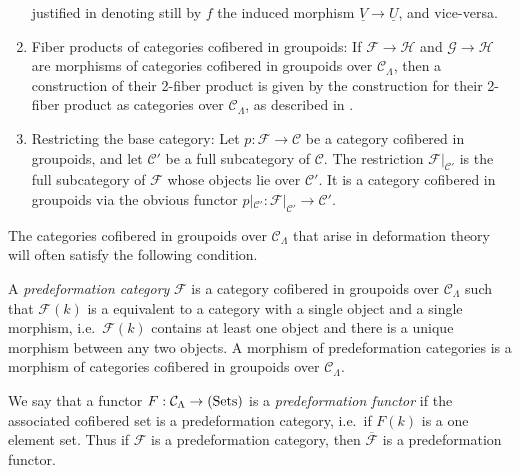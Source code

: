 \begin{remarks}
\begin{enumerate}
justified in denoting still by $f$ the induced morphism $\underline{V} 
\rightarrow \underline{U}$, and vice-versa.
\item Fiber products of categories cofibered in groupoids: If $\mathcal F 
\rightarrow \mathcal H$ and $\mathcal G \rightarrow \mathcal H$ are morphisms 
of categories cofibered in groupoids over $\mathcal C_{\Lambda}$, then a 
construction of their 2-fiber product is given by the construction for their 
2-fiber product as categories over $\mathcal C_{\Lambda}$, as described in 
\cite[Lemma 4.20.3]{stacks-project}.
\item 
\label{definition-restricting-base-category}
Restricting the base category: Let $p : \mathcal F \rightarrow \mathcal C$ be a 
category cofibered in groupoids, and let $\mathcal C'$ be a full subcategory of 
$\mathcal C$.  The restriction $\mathcal F|_{\mathcal C'}$ is the full 
subcategory of $\mathcal F$ whose objects lie over $\mathcal C'$. It is a 
category cofibered in groupoids via the obvious functor $p|_{\mathcal C'}: 
\mathcal F|_{\mathcal C'} \rightarrow \mathcal C'$.
\end{enumerate}
\end{remarks}

\noindent
The categories cofibered in groupoids over $\mathcal C_{\Lambda}$ that arise in 
deformation theory will often satisfy the following condition.

\begin{definition}
\label{definition-predeformation-category}
A \emph{predeformation category} $\mathcal F$ is a category cofibered in 
groupoids over $\mathcal C_{\Lambda}$ such that $\mathcal F(k)$ is a equivalent 
to a category with a single object and a single morphism, i.e.\ $\mathcal F(k)$ 
contains at least one object and there is a unique morphism between any two 
objects. A morphism of predeformation categories is a morphism of categories 
cofibered in groupoids over $\mathcal C_{\Lambda}$.
\end{definition}

\begin{remark}
We say that a functor $F: \mathcal C_{\Lambda} \rightarrow \textnormal{(Sets)}$ 
is a \emph{predeformation functor} if the associated cofibered set is a 
predeformation category, i.e.\ if $F(k)$ is a one element set.  Thus if 
$\mathcal F$ is a predeformation category, then $\overline{\mathcal F}$ is a 
predeformation functor.
\end{remark}

